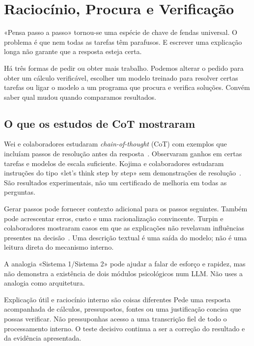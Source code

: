 \chapter{Raciocínio, Procura e Verificação}
\label{ch:raciocinio}

«Pensa passo a passo» tornou-se uma espécie de chave de fendas universal. O problema é que nem todas as tarefas têm parafusos. E escrever uma explicação longa não garante que a resposta esteja certa.

Há três formas de pedir ou obter mais trabalho. Podemos alterar o pedido para obter um cálculo verificável, escolher um modelo treinado para resolver certas tarefas ou ligar o modelo a um programa que procura e verifica soluções. Convém saber qual mudou quando comparamos resultados.

\section{O que os estudos de CoT mostraram}
Wei e colaboradores estudaram \emph{chain-of-thought} (CoT) com exemplos que incluíam passos de resolução antes da resposta~\citep{wei2022}. Observaram ganhos em certas tarefas e modelos de escala suficiente. Kojima e colaboradores estudaram instruções do tipo «let's think step by step» sem demonstrações de resolução~\citep{kojima2022}. São resultados experimentais, não um certificado de melhoria em todas as perguntas.

Gerar passos pode fornecer contexto adicional para os passos seguintes. Também pode acrescentar erros, custo e uma racionalização convincente. Turpin e colaboradores mostraram casos em que as explicações não revelavam influências presentes na decisão~\citep{turpin2023}. Uma descrição textual é uma saída do modelo; não é uma leitura direta do mecanismo interno.

A analogia «Sistema 1/Sistema 2» pode ajudar a falar de esforço e rapidez, mas não demonstra a existência de dois módulos psicológicos num LLM. Não uses a analogia como arquitetura.

\begin{keyideabox}{Explicação útil e raciocínio interno são coisas diferentes}
Pede uma resposta acompanhada de cálculos, pressupostos, fontes ou uma justificação concisa que possas verificar. Não pressuponhas acesso a uma transcrição fiel de todo o processamento interno. O teste decisivo continua a ser a correção do resultado e da evidência apresentada.
\end{keyideabox}

